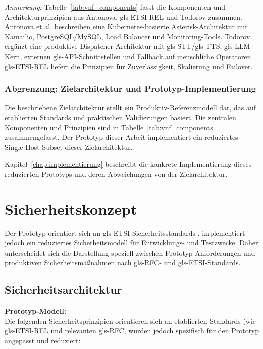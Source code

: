 \noindent \textit{Anmerkung:} Tabelle~\ref{tab:vnf_components} fasst die Komponenten und Architekturprinzipien aus Antonova, \gls{gls-ETSI}-REL und Todorov zusammen. Antonova et al. beschreiben eine Kubernetes-basierte Asterisk-Architektur mit Kamailio, PostgreSQL/MySQL, Load Balancer und Monitoring-Tools. Todorov ergänzt eine produktive Dispatcher-Architektur mit \gls{gls-STT}/\gls{gls-TTS}, \gls{gls-LLM}-Kern, externen \gls{gls-API}-Schnittstellen und Fallback auf menschliche Operatoren. \gls{gls-ETSI}-REL liefert die Prinzipien für Zuverlässigkeit, Skalierung und Failover.

\subsubsection{Abgrenzung: Zielarchitektur und Prototyp-Implementierung}

Die beschriebene Zielarchitektur stellt ein Produktiv-Referenzmodell dar, das auf etablierten Standards und praktischen Validierungen basiert. Die zentralen Komponenten und Prinzipien sind in Tabelle~\ref{tab:vnf_components} zusammengefasst. Der Prototyp dieser Arbeit implementiert ein reduziertes Single-Host-Subset dieser Zielarchitektur.

Kapitel~\ref{chap:implementierung} beschreibt die konkrete Implementierung dieses reduzierten Prototyps und deren Abweichungen von der Zielarchitektur.

\section{Sicherheitskonzept}

Der Prototyp orientiert sich an \gls{gls-ETSI}-Sicherheitsstandards \parencite{ETSI-REL}, implementiert jedoch ein reduziertes Sicherheitsmodell für Entwicklungs- und Testzwecke. Daher unterscheidet sich die Darstellung speziell zwischen Prototyp-Anforderungen und produktiven Sicherheitsma\ss nahmen nach \gls{gls-RFC}- und \gls{gls-ETSI}-Standards.

\subsection{Sicherheitsarchitektur}

\textbf{Prototyp-Modell:}\\
Die folgenden Sicherheitsprinzipien orientieren sich an etablierten Standards (wie \gls{gls-ETSI}-REL und relevanten \gls{gls-RFC}, wurden jedoch spezifisch für den Prototyp angepasst und reduziert:

